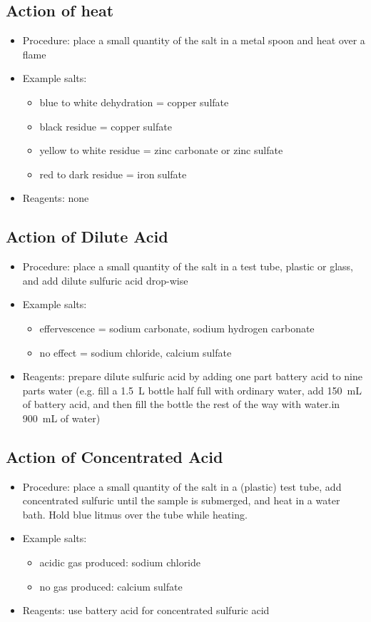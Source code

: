 \subsection{Action of heat}
\begin{itemize}
\item{Procedure: place a small quantity of the salt 
in a metal spoon and heat over a flame}
\item{Example salts:} 
\begin{itemize}
\item{blue to white dehydration = copper sulfate}
\item{black residue = copper sulfate}
\item{yellow to white residue = zinc carbonate or zinc sulfate} 
\item{red to dark residue = iron sulfate}
\end{itemize}
\item{Reagents: none}
\end{itemize}

\subsection{Action of Dilute Acid} 
\begin{itemize}
\item{Procedure: place a small quantity of the salt in a test tube, 
plastic or glass, 
and add dilute sulfuric acid drop-wise}
\item{Example salts:}
\begin{itemize}
\item{effervescence = sodium carbonate, 
sodium hydrogen carbonate}
\item{no effect = sodium chloride, 
calcium sulfate}
\end{itemize}
\item{Reagents: prepare dilute sulfuric acid 
by adding one part battery acid to nine parts water (e.g. 
fill a 1.5~L bottle half full with ordinary water, 
add 150~mL of battery acid, 
and then fill the bottle the rest of the way 
with water.in 900~mL of water)}
\end{itemize}

\subsection{Action of Concentrated Acid}
\begin{itemize}
\item{Procedure: place a small quantity of the salt in a (plastic) test tube, 
add concentrated sulfuric until the sample is submerged, 
and heat in a water bath. 
Hold blue litmus over the tube while heating.}
\item{Example salts:}
\begin{itemize}
\item{acidic gas produced: sodium chloride}
\item{no gas produced: calcium sulfate}
\end{itemize}
\item{Reagents: use battery acid for concentrated sulfuric acid}
\end{itemize}

